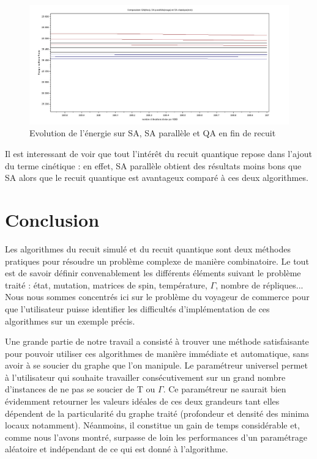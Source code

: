 \documentclass{article}%
\begin{document}
	\begin{figure}[!ht]
		
	\begin{center}
	\includegraphics[scale=0.25]{brazil58_zoom.jpg}
	\caption{Evolution de l'énergie sur SA, SA parallèle et QA en fin de recuit}
	\label{comparaison}
	\end{center}
	\end{figure}

	
		Il est interessant de voir que tout l'intérêt du recuit quantique repose dans l'ajout du terme cinétique : en effet, SA parallèle obtient des résultats moins bons que SA alors que le recuit quantique est avantageux comparé à ces deux algorithmes.
		

\clearpage	
\section*{Conclusion}

\vspace{1cm}

		Les algorithmes du recuit simulé et du recuit quantique sont deux méthodes pratiques pour résoudre un problème complexe de manière combinatoire. Le tout est de savoir définir convenablement les différents éléments suivant le problème traité : état, mutation, matrices de spin, température, $ \Gamma $, nombre de répliques... Nous nous sommes concentrés ici sur le problème du voyageur de commerce pour que l'utilisateur puisse identifier les difficultés d'implémentation de ces algorithmes sur un exemple précis. 
		
		\vspace{0.5cm}
		
		Une grande partie de notre travail a consisté à trouver une méthode satisfaisante pour pouvoir utiliser ces algorithmes de manière immédiate et automatique, sans avoir à se soucier du graphe que l'on manipule. Le paramétreur universel permet à l'utilisateur qui souhaite travailler consécutivement sur un grand nombre d'instances de ne pas se soucier de T ou $ \Gamma $. Ce paramétreur ne saurait bien évidemment retourner les valeurs idéales de ces deux grandeurs tant elles dépendent de la particularité du graphe traité (profondeur et densité des minima locaux notamment). Néanmoins, il constitue un gain de temps considérable et, comme nous l'avons montré, surpasse de loin les performances d'un paramétrage aléatoire et indépendant de ce qui est donné à l'algorithme.
		
\end{document}
